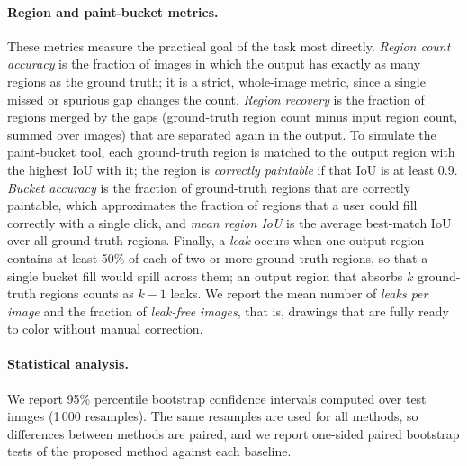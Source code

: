 \documentclass[pdflatex,sn-mathphys-num]{sn-jnl}%
\begin{document}
\paragraph{Region and paint-bucket metrics.} These metrics measure the practical goal
of the task most directly. \emph{Region count accuracy} is the fraction of images in
which the output has exactly as many regions as the ground truth; it is a strict,
whole-image metric, since a single missed or spurious gap changes the count.
\emph{Region recovery} is the fraction of regions merged by the gaps (ground-truth
region count minus input region count, summed over images) that are separated again
in the output. To simulate the paint-bucket tool, each ground-truth region is matched
to the output region with the highest IoU with it; the region is \emph{correctly
paintable} if that IoU is at least 0.9. \emph{Bucket accuracy} is the fraction of
ground-truth regions that are correctly paintable, which approximates the fraction of
regions that a user could fill correctly with a single click, and \emph{mean region
IoU} is the average best-match IoU over all ground-truth regions. Finally, a
\emph{leak} occurs when one output region contains at least 50\% of each of two or
more ground-truth regions, so that a single bucket fill would spill across them; an
output region that absorbs $k$ ground-truth regions counts as $k-1$ leaks. We report
the mean number of \emph{leaks per image} and the fraction of \emph{leak-free images},
that is, drawings that are fully ready to color without manual correction.

\paragraph{Statistical analysis.} We report 95\% percentile bootstrap confidence
intervals \citep{efron1994bootstrap} computed over test images (1\,000 resamples).
The same resamples are used for all methods, so differences between methods are
paired, and we report one-sided paired bootstrap tests of the proposed method against
each baseline.
\end{document}
